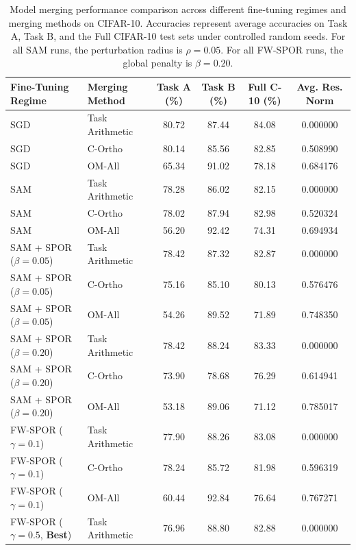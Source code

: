 \documentclass{article}
\theoremstyle{plain}
\theoremstyle{definition}
\theoremstyle{remark}
\begin{document}
\begin{table}[t]
\caption{Model merging performance comparison across different fine-tuning regimes and merging methods on CIFAR-10. Accuracies represent average accuracies on Task A, Task B, and the Full CIFAR-10 test sets under controlled random seeds. For all SAM runs, the perturbation radius is $\rho=0.05$. For all FW-SPOR runs, the global penalty is $\beta=0.20$.}
\label{tab:results}
\vskip 0.15in
\begin{center}
\begin{small}
\begin{sc}
\setlength{\tabcolsep}{5pt}
\begin{tabular}{llcccc}
\toprule
Fine-Tuning Regime & Merging Method & Task A (\%) & Task B (\%) & Full C-10 (\%) & Avg. Res. Norm \\
\midrule
SGD & Task Arithmetic & 80.72 & 87.44 & 84.08 & 0.000000 \\
SGD & C-Ortho & 80.14 & 85.56 & 82.85 & 0.508990 \\
SGD & OM-All & 65.34 & 91.02 & 78.18 & 0.684176 \\
\midrule
SAM & Task Arithmetic & 78.28 & 86.02 & 82.15 & 0.000000 \\
SAM & C-Ortho & 78.02 & 87.94 & 82.98 & 0.520324 \\
SAM & OM-All & 56.20 & 92.42 & 74.31 & 0.694934 \\
\midrule
SAM + SPOR ($\beta=0.05$) & Task Arithmetic & 78.42 & 87.32 & 82.87 & 0.000000 \\
SAM + SPOR ($\beta=0.05$) & C-Ortho & 75.16 & 85.10 & 80.13 & 0.576476 \\
SAM + SPOR ($\beta=0.05$) & OM-All & 54.26 & 89.52 & 71.89 & 0.748350 \\
\midrule
SAM + SPOR ($\beta=0.20$) & Task Arithmetic & 78.42 & 88.24 & 83.33 & 0.000000 \\
SAM + SPOR ($\beta=0.20$) & C-Ortho & 73.90 & 78.68 & 76.29 & 0.614941 \\
SAM + SPOR ($\beta=0.20$) & OM-All & 53.18 & 89.06 & 71.12 & 0.785017 \\
\midrule
FW-SPOR ($\gamma=0.1$) & Task Arithmetic & 77.90 & 88.26 & 83.08 & 0.000000 \\
FW-SPOR ($\gamma=0.1$) & C-Ortho & 78.24 & 85.72 & 81.98 & 0.596319 \\
FW-SPOR ($\gamma=0.1$) & OM-All & 60.44 & 92.84 & 76.64 & 0.767271 \\
\midrule
FW-SPOR ($\gamma=0.5$, \textbf{Best}) & Task Arithmetic & 76.96 & 88.80 & 82.88 & 0.000000 \\

\end{tabular}
\end{sc}
\end{small}
\end{center}
\end{table}
\end{document}
